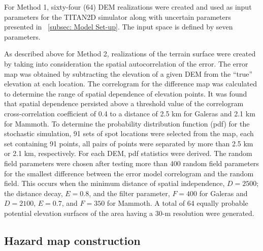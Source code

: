 \documentclass[12pt]{article}
\begin{document}
For Method 1, sixty-four (64) DEM realizations were created and used
as input parameters for the TITAN2D simulator along with uncertain
parameters presented in ~\ref{subsec: Model Set-up}.  The input space is defined
by seven parameters. 



As described above for Method 2, realizations of the terrain surface
were created by taking into consideration the spatial autocorrelation
of the error.  The error map was obtained by subtracting the elevation
of a given DEM from the ``true'' elevation at each location. The
correlogram for the difference map was calculated to determine the
range of spatial dependence of elevation points. It was found that spatial
dependence persisted above a threshold value of the correlogram
cross-correlation coefficient of 0.4 to a distance of 2.5 km for
Galeras and 2.1 km for Mammoth. To determine the probability
distribution function (pdf) for the stochastic simulation, 91 sets of
spot locations were selected from the map, each set containing 91
points, all pairs of points were separated by more than 2.5 km or
2.1 km, respectively. For each DEM, pdf statistics were derived.
The random field parameters were chosen after testing more than 400
random field parameters for the smallest difference between the error
model correlogram and the random field.  This occurs when the minimum
distance of spatial independence, $D =2500$; the distance decay, $E =
0.8$, and the filter parameter, $F =400$ for Galeras and $D =2100$, $E
= 0.7$, and $F =350$ for Mammoth.  A total of 64 equally probable
potential elevation surfaces of the area having a 30-m resolution were
generated.

\subsection{Hazard map construction}
 
\end{document}

